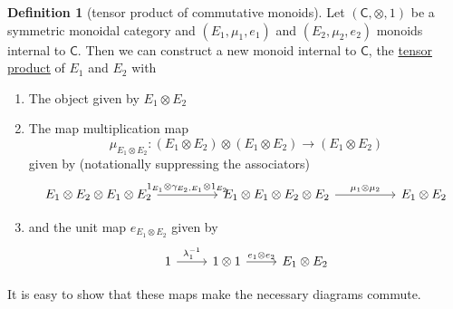 \documentclass[a4paper,10pt]{scrreprt}
\newcommand{\defn}[1]{\ul{#1}}
\theoremstyle{definition}
\newtheorem{definition}{Definition}[section]
\theoremstyle{plain}
\theoremstyle{remark}
\begin{document}
\begin{definition}[tensor product of commutative monoids]
  \label{def:tensorproductofcommutativemonoids}
  Let $(\mathsf{C}, \otimes, 1)$ be a symmetric monoidal category and $(E_{1}, \mu_{1}, e_{1})$ and $(E_{2}, \mu_{2}, e_{2})$ monoids internal to $\mathsf{C}$. Then we can construct a new monoid internal to $\mathsf{C}$, the \defn{tensor product} of $E_{1}$ and $E_{2}$ with

  \begin{enumerate}
    \item The object given by $E_{1} \otimes E_{2}$

    \item The map multiplication map
      \begin{equation*}
        \mu_{E_{1} \otimes E_{2}}\colon (E_{1} \otimes E_{2}) \otimes (E_{1} \otimes E_{2}) \to (E_{1} \otimes E_{2})
      \end{equation*}
      given by (notationally suppressing the associators)
      \begin{equation*}
        \begin{tikzcd}[column sep=huge]
          E_{1} \otimes E_{2} \otimes E_{1} \otimes E_{2} 
          \arrow[r, "{1_{E_{1}} \otimes \gamma_{E_{2}, E_{1}} \otimes 1_{E_{2}}}"]
          & E_{1} \otimes E_{1} \otimes E_{2} \otimes E_{2}  
          \arrow[r, "\mu_{1} \otimes \mu_{2}"]
          & E_{1} \otimes E_{2}
        \end{tikzcd}
      \end{equation*}

    \item and the unit map $e_{E_{1} \otimes E_{2}}$ given by
      \begin{equation*}
        \begin{tikzcd}
          1
          \arrow[r, "\lambda^{-1}_{1}"]
          & 1 \otimes 1
          \arrow[r, "e_{1} \otimes e_{2}"]
          & E_{1} \otimes E_{2}
        \end{tikzcd}
      \end{equation*}
  \end{enumerate}

  It is easy to show that these maps make the necessary diagrams commute.
\end{definition}
\end{document}
